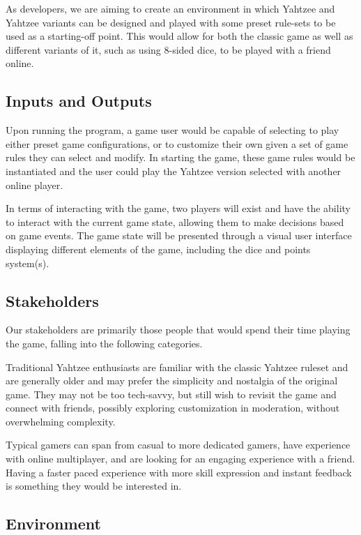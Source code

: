 \documentclass{article}
\begin{document}
As developers, we are aiming to create an environment in which Yahtzee and Yahtzee variants can be designed and played with some preset rule-sets to be used as a starting-off point. This would allow for both the classic game as well as different variants of it, such as using 8-sided dice, to be played with a friend online.

\subsection{Inputs and Outputs}

Upon running the program, a game user would be capable of selecting to play either preset game configurations, or to customize their own given a set of game rules they can select and modify. In starting the game, these game rules would be instantiated and the user could play the Yahtzee version selected with another online player.

In terms of interacting with the game, two players will exist and have the ability to interact with the current game state, allowing them to make decisions based on game events. The game state will be presented through a visual user interface displaying different elements of the game, including the dice and points system(s).

\subsection{Stakeholders}

Our stakeholders are primarily those people that would spend their time playing the game, falling into the following categories.

Traditional Yahtzee enthusiasts are familiar with the classic Yahtzee ruleset and are generally older and may prefer the simplicity and nostalgia of the original game. They may not be too tech-savvy, but still wish to revisit the game and connect with friends, possibly exploring customization in moderation, without overwhelming complexity.

Typical gamers can span from casual to more dedicated gamers, have experience with online multiplayer, and are looking for an engaging experience with a friend. Having a faster paced experience with more skill expression and instant feedback is something they would be interested in.


\subsection{Environment}
\end{document}
